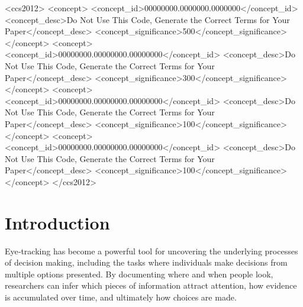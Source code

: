 \documentclass[manuscript,review,anonymous]{acmart}
\begin{document}
\begin{CCSXML}
<ccs2012>
 <concept>
  <concept_id>00000000.0000000.0000000</concept_id>
  <concept_desc>Do Not Use This Code, Generate the Correct Terms for Your Paper</concept_desc>
  <concept_significance>500</concept_significance>
 </concept>
 <concept>
  <concept_id>00000000.00000000.00000000</concept_id>
  <concept_desc>Do Not Use This Code, Generate the Correct Terms for Your Paper</concept_desc>
  <concept_significance>300</concept_significance>
 </concept>
 <concept>
  <concept_id>00000000.00000000.00000000</concept_id>
  <concept_desc>Do Not Use This Code, Generate the Correct Terms for Your Paper</concept_desc>
  <concept_significance>100</concept_significance>
 </concept>
 <concept>
  <concept_id>00000000.00000000.00000000</concept_id>
  <concept_desc>Do Not Use This Code, Generate the Correct Terms for Your Paper</concept_desc>
  <concept_significance>100</concept_significance>
 </concept>
</ccs2012>
\end{CCSXML}





\maketitle

\section{Introduction}
    Eye‐tracking has become a powerful tool for uncovering the underlying processes of decision making, including the tasks where individuals make decisions from multiple options presented. By documenting where and when people look, researchers can infer which pieces of information attract attention, how evidence is accumulated over time, and ultimately how choices are made.
\end{document}
